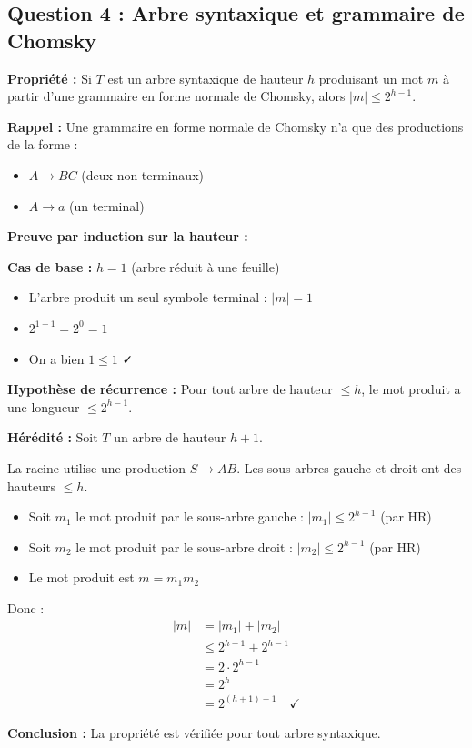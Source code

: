 \documentclass[12pt,a4paper]{article}
\begin{document}
\subsection{Question 4 : Arbre syntaxique et grammaire de Chomsky}

\begin{demonstration}
\textbf{Propriété :} Si $T$ est un arbre syntaxique de hauteur $h$ produisant un mot $m$ à partir d'une grammaire en forme normale de Chomsky, alors $|m| \leq 2^{h-1}$.

\textbf{Rappel :} Une grammaire en forme normale de Chomsky n'a que des productions de la forme :
\begin{itemize}
    \item $A \to BC$ (deux non-terminaux)
    \item $A \to a$ (un terminal)
\end{itemize}

\textbf{Preuve par induction sur la hauteur :}

\textbf{Cas de base :} $h = 1$ (arbre réduit à une feuille)
\begin{itemize}
    \item L'arbre produit un seul symbole terminal : $|m| = 1$
    \item $2^{1-1} = 2^0 = 1$
    \item On a bien $1 \leq 1$ ✓
\end{itemize}

\textbf{Hypothèse de récurrence :} Pour tout arbre de hauteur $\leq h$, le mot produit a une longueur $\leq 2^{h-1}$.

\textbf{Hérédité :} Soit $T$ un arbre de hauteur $h+1$.

La racine utilise une production $S \to AB$. Les sous-arbres gauche et droit ont des hauteurs $\leq h$.

\begin{itemize}
    \item Soit $m_1$ le mot produit par le sous-arbre gauche : $|m_1| \leq 2^{h-1}$ (par HR)
    \item Soit $m_2$ le mot produit par le sous-arbre droit : $|m_2| \leq 2^{h-1}$ (par HR)
    \item Le mot produit est $m = m_1 m_2$
\end{itemize}

Donc :
\begin{align*}
|m| &= |m_1| + |m_2| \\
&\leq 2^{h-1} + 2^{h-1} \\
&= 2 \cdot 2^{h-1} \\
&= 2^h \\
&= 2^{(h+1)-1} \quad ✓
\end{align*}

\textbf{Conclusion :} La propriété est vérifiée pour tout arbre syntaxique.
\end{demonstration}
\end{document}
